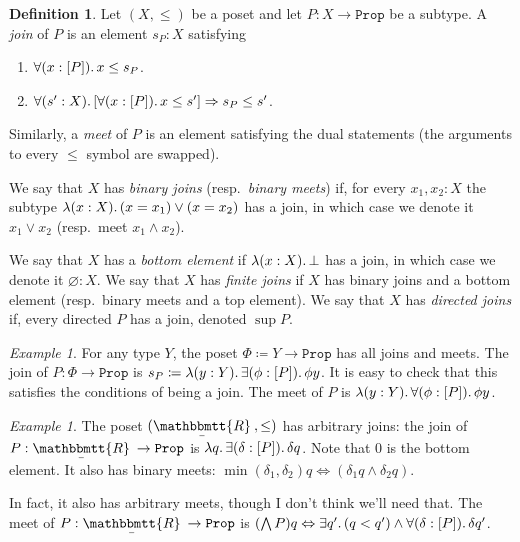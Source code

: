 \documentclass[11pt, oneside, article]{memoir}
\theoremstyle{plain}
\theoremstyle{definition}
\newtheorem{definition}[theorem]{Definition}
\theoremstyle{remark}
\newtheorem{example}[theorem]{Example}
\DeclarePairedDelimiter{\subtype}{[}{]}
\newcommand{\const}[1]{\mathtt{#1}}
\newcommand{\ubar}[1]{\underaccent{\bar}{#1}}
\newcommand{\internal}[1]{\raisebox{-.03ex}{$\mathbbmtt{#1}$}}
\newcommand{\hs}{\hspace{1.1pt}}
\newcommand{\tRR}{\internal{R}\hs}
\newcommand{\tLR}{\ubar{\tRR}\hs}
\newcommand{\Prop}{\const{Prop}}
\newcommand{\imp}{\Rightarrow}
\renewcommand{\iff}{\Leftrightarrow}
\begin{document}
\begin{definition}
Let $(X,\leq)$ be a poset and let $P:X\to\Prop$ be a subtype. A \emph{join} of $P$ is an element $s_P:X$ satisfying
\begin{enumerate}
	\item $\forall(x:\subtype{P})\ldotp x\leq s_P$.
	\item $\forall(s':X)\ldotp[\forall(x:\subtype{P})\ldotp x\leq s']\imp s_P\leq s'$.
\end{enumerate}
Similarly, a \emph{meet} of $P$ is an element satisfying the dual statements (the arguments to every $\leq$ symbol are swapped).

We say that $X$ has \emph{binary joins} (resp.\ \emph{binary meets}) if, for every $x_1,x_2:X$ the subtype $\lambda(x:X)\ldotp (x=x_1) \vee (x=x_2)$ has a join, in which case we denote it $x_1\vee x_2$ (resp.\ meet $x_1\wedge x_2$). 

We say that $X$ has a \emph{bottom element} if $\lambda(x:X)\ldotp \bot$ has a join, in which case we denote it $\varnothing:X$. We say that $X$ has \emph{finite joins} if $X$ has binary joins and a bottom element (resp.\ binary meets and a top element). We say that $X$ has \emph{directed joins} if, every directed $P$ has a join, denoted $\sup P$.
\end{definition}

\begin{example}
For any type $Y$, the poset $\Phi\coloneqq Y\to\Prop$ has all joins and meets. The join of $P:\Phi\to\Prop$ is $s_P\coloneqq\lambda(y:Y)\ldotp\exists(\phi:\subtype{P})\ldotp\phi y$. It is easy to check that this satisfies the conditions of being a join. The meet of $P$ is $\lambda(y:Y)\ldotp\forall(\phi:\subtype{P})\ldotp\phi y$.
\end{example}

\begin{example}
The poset $(\tLR,\leq)$ has arbitrary joins: the join of $P:\tLR\to\Prop$ is $\lambda q\ldotp\exists(\delta:\subtype{P})\ldotp\delta q$. Note that $0$ is the bottom element. It also has binary meets: $\min(\delta_1,\delta_2)q\iff(\delta_1 q\wedge \delta_2q)$.

In fact, it also has arbitrary meets, though I don't think we'll need that. The meet of $P:\tLR\to\Prop$ is $(\bigwedge P)q\iff\exists q'\ldotp (q<q')\wedge\forall(\delta:\subtype{P})\ldotp\delta q'$.
\end{example}
\end{document}

